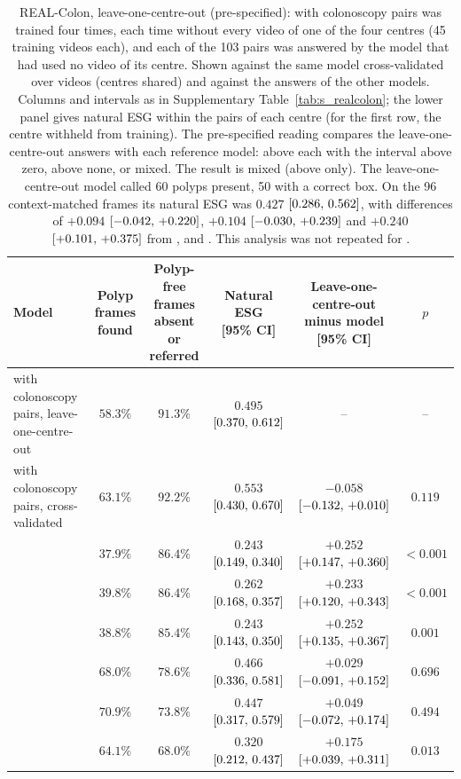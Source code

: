 \begin{table}[!htbp]
\caption{REAL-Colon, leave-one-centre-out (pre-specified): \msp{} with colonoscopy pairs was trained four times, each time without every video of one of the four centres (45 training videos each), and each of the 103 pairs was answered by the model that had used no video of its centre. Shown against the same model cross-validated over videos (centres shared) and against the answers of the other models. Columns and intervals as in Supplementary Table~\ref{tab:s_realcolon}; the lower panel gives natural ESG within the pairs of each centre (for the first row, the centre withheld from training). The pre-specified reading compares the leave-one-centre-out answers with each reference model: above each with the interval above zero, above none, or mixed. The result is mixed (above \gpt{} only). The leave-one-centre-out model called 60 polyps present, 50 with a correct box. On the 96 context-matched frames its natural ESG was $0.427$ $[0.286,\,0.562]$, with differences of $+0.094$ $[-0.042,\,+0.220]$, $+0.104$ $[-0.030,\,+0.239]$ and $+0.240$ $[+0.101,\,+0.375]$ from \gem{}, \opus{} and \gpt{}. This analysis was not repeated for \msn{}.}
\label{tab:s_loco}
\centering
\footnotesize
\begin{adjustbox}{max width=\linewidth}
\begin{tabular}{l cc c cc}
\toprule
Model & \shortstack{Polyp frames\\found} & \shortstack{Polyp-free frames\\absent or referred} & \shortstack{Natural ESG\\{}[95\% CI]} & \shortstack{Leave-one-centre-out\\minus model [95\% CI]} & $p$ \\
\midrule
\msp{} with colonoscopy pairs, leave-one-centre-out & $58.3\%$ & $91.3\%$ & $0.495$ $[0.370,\,0.612]$ & -- & -- \\
\msp{} with colonoscopy pairs, cross-validated & $63.1\%$ & $92.2\%$ & $0.553$ $[0.430,\,0.670]$ & $-0.058$ $[-0.132,\,+0.010]$ & $0.119$ \\
\ms{} & $37.9\%$ & $86.4\%$ & $0.243$ $[0.149,\,0.340]$ & $+0.252$ $[+0.147,\,+0.360]$ & $<0.001$ \\
\msp{} & $39.8\%$ & $86.4\%$ & $0.262$ $[0.168,\,0.357]$ & $+0.233$ $[+0.120,\,+0.343]$ & $<0.001$ \\
\base{} & $38.8\%$ & $85.4\%$ & $0.243$ $[0.143,\,0.350]$ & $+0.252$ $[+0.135,\,+0.367]$ & $0.001$ \\
\gem{} & $68.0\%$ & $78.6\%$ & $0.466$ $[0.336,\,0.581]$ & $+0.029$ $[-0.091,\,+0.152]$ & $0.696$ \\
\opus{} & $70.9\%$ & $73.8\%$ & $0.447$ $[0.317,\,0.579]$ & $+0.049$ $[-0.072,\,+0.174]$ & $0.494$ \\
\gpt{} & $64.1\%$ & $68.0\%$ & $0.320$ $[0.212,\,0.437]$ & $+0.175$ $[+0.039,\,+0.311]$ & $0.013$ \\
\bottomrule
\end{tabular}
\end{adjustbox}


\end{table}
